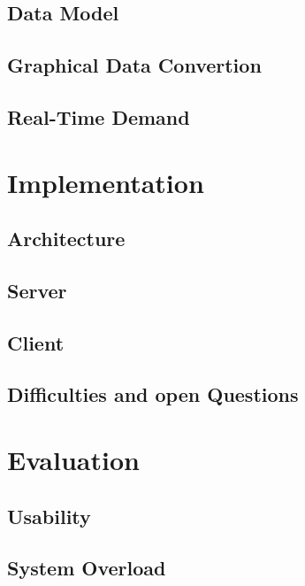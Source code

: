 \documentclass[english, BCOR=6mm, twoside=true, open=right]{tudscrreprt}
\begin{document}
\section{Data Model}
\section{Graphical Data Convertion}
\section{Real-Time Demand}

\chapter{Implementation}
\section{Architecture}
\section{Server}
\section{Client}
\section{Difficulties and open Questions}


\chapter{Evaluation}
\section{Usability}
\section{System Overload}
\end{document}
